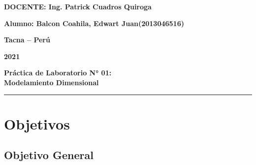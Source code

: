 \documentclass{article}
\begin{document}
\begin{titlepage}
\begin{center}
\vspace*{0.3in}
\begin{Large}
\textbf{DOCENTE: Ing. Patrick Cuadros Quiroga} \\
\end{Large}

\vspace*{0.2in}
\vspace*{0.1in}
\begin{large}

\begin{Large}
\textbf{Alumno: Balcon Coahila, Edwart Juan\hfill	(2013046516) } \\
\end{Large}

\vspace*{0.15in}
\begin{Large}
\textbf{Tacna – Perú} \\
\end{Large}

\vspace*{0.05in}
\begin{Large}
\textbf{2021 } \\
\end{Large}

\end{large}
\end{center}

\end{titlepage}


\begin{center}
\begin{LARGE}
	\textbf{Práctica de Laboratorio N° 01: \\ Modelamiento Dimensional} \\ 
\end{LARGE}
\rule{110mm}{0.1mm}
\end{center}




\section{Objetivos}
\subsection{\textbf{Objetivo General}}
\end{document}
